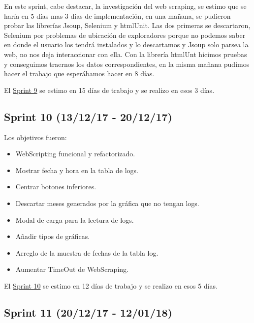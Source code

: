 En este sprint, cabe destacar, la investigación del web scraping, se estimo que se haría en 5 días mas 3 dias de implementación, en una mañana, se pudieron probar las librerías Jsoup, Selenium y htmlUnit. Las dos primeras se descartaron, Selenium por problemas de ubicación de exploradores porque no podemos saber en donde el usuario los tendrá instalados y lo descartamos y Jsoup solo parsea la web, no nos deja interaccionar con ella. Con la librería htmlUnt hicimos pruebas y conseguimos traernos los datos correspondientes, en la misma mañana pudimos hacer el trabajo que esperábamos hacer en 8 días.

El \href{https://github.com/trona85/GII-17.1B-UBULog-1.0/milestone/9?closed=1}{Sprint 9} se estimo en 15 días de trabajo y se realizo en esos 3 días.


\subsection{Sprint 10 (13/12/17 -
	20/12/17)}\label{sprint-10-131217---201217}

Los objetivos fueron:
\begin{itemize}
	\tightlist
	\item
	WebScripting funcional y refactorizado.
	\item
	Mostrar fecha y hora en la tabla de logs.
	\item
	Centrar botones inferiores.
	\item
	Descartar meses generados por la gráfica que no tengan logs.
	\item
	Modal de carga para la lectura de logs.
	\item
	Añadir tipos de gráficas.
	\item
	Arreglo de la muestra de fechas de la tabla log.
	\item
	Aumentar TimeOut de WebScraping.
	
\end{itemize}

El \href{https://github.com/trona85/GII-17.1B-UBULog-1.0/milestone/10?closed=1}{Sprint 10} se estimo en 12 días de trabajo y se realizo en esos 5 días.


\subsection{Sprint 11 (20/12/17 -
	12/01/18)}\label{sprint-11-201217---120118}

